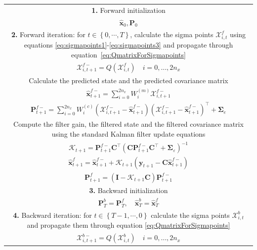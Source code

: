 \documentclass[review,authoryear,3p]{elsarticle}
\begin{document}
\clearpage
\newpage
\renewcommand{\arraystretch}{1.7}
\begin{table}[!ht]
\begin{tabular}{|c|}\hline
\multicolumn{1}{|p{16cm}|}{\textbf{1.} Forward initialization} \\ 
$\hat{\mathbf x}_0, \mathbf P_0$ \\
\hline
\multicolumn{1}{|p{16cm}|}{\textbf{2.} Forward iteration: for $t \in \left\lbrace 0,\cdots, T\right\rbrace $, calculate the sigma points $\mathcal X_{i,t}^f$ using equations \ref{eq:sigmapoints1}-\ref{eq:sigmapoints3} and propagate through equation~\ref{eq:QmatrixForSigmapoints}} \\
$\mathcal X_{i,t+1}^{f-}=Q(\mathcal X_{i,t}^f) \quad i=0, \dots, 2n_x$\\
\multicolumn{1}{|p{16cm}|}{Calculate the predicted state and the predicted covariance matrix} \\
$\hat{\mathbf x}_{t+1}^{f-}=\sum_{i=0}^{2n_x} W_i^{(m)}\mathcal X_{i,t+1}^{f-} $ \\
$\mathbf P_{t +1}^{f-}=\sum_{i=0}^{2n_x} W_i^{(c)}(\mathcal X_{i,t+1}^{f-}-\hat{\mathbf x}_{t +1}^{f-})(\mathcal X_{i,t+1}^{f-}-\hat{\mathbf x}_{t +1}^{f-})^\top+\boldsymbol \Sigma_e$ \\ 
\multicolumn{1}{|p{16cm}|}{Compute the filter gain, the filtered state and the filtered covariance matrix using the standard Kalman filter update equations} \\
$\mathcal K_{t+1}=\mathbf P_{t +1}^{f-}\mathbf C ^\top(\mathbf C \mathbf P_{t +1}^{f-}\mathbf C ^\top+\boldsymbol \Sigma_{\varepsilon})^{-1}$ \\
$\hat{\mathbf x}_{t+1}^{f}=\hat{\mathbf x}_{t+1}^{f-}+\mathcal K_{t+1}(\mathbf y_{t+1}-\mathbf C\hat{\mathbf x}_{t +1}^{f-})$ \\
$\mathbf P_{t+1}^f=(\mathbf I - \mathcal K_{t+1}\mathbf C)\mathbf P_{t +1}^{f-}$\\ 
\hline
\multicolumn{1}{|p{16cm}|}{\textbf{3.} Backward initialization}\\
$\mathbf P_T^b= \mathbf P_T^f, \quad \hat{\mathbf x}^b_T= \hat{\mathbf x}^f_T$ \\
\hline
\multicolumn{1}{|p{16cm}|}{\textbf{4.} Backward iteration: for $t \in \left\lbrace T-1, \cdots, 0 \right\rbrace $ calculate the sigma points $\mathcal X_{i,t}^b$ and propagate them through equation \ref{eq:QmatrixForSigmapoints}}\\
$\mathcal X_{i,t+1}^{b-}=Q(\mathcal X_{i,t}^b) \quad i=0, \dots, 2n_x$\\

\end{tabular}
\end{table}
\end{document}
